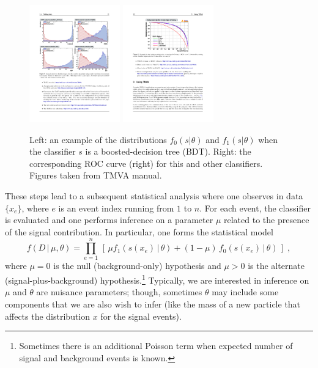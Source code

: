 \documentclass[11pt, oneside]{article}   	%
\begin{document}
\begin{figure}[htbp]
\begin{center}
 \includegraphics[height=2in]{example-TMVA-BDT.pdf}
 \includegraphics[height=2in]{example-TMVA-ROC.pdf}
\caption{Left: an example of the distributions $f_0(s|\theta)$ and $f_1(s|\theta)$ when the classifier $s$ is a boosted-decision tree (BDT). Right: the corresponding ROC curve (right) for this and other classifiers. Figures taken from TMVA manual.}
\label{fig:tmva}
\end{center}
\end{figure}

These steps lead to a subsequent statistical analysis where one observes in data $\{x_e\}$, where $e$ is an event index running from $1$ to $n$. For each event, the classifier is evaluated and one performs inference on a parameter $\mu$ related to the presence of the signal contribution. In particular, one forms the statistical model
\begin{equation}\label{eq:typicalML}
f( D \,|\, \mu, \theta) = \prod_{e=1}^n \, \left[\, \mu f_1( s(x_e) \, |\,  \theta)  + (1-\mu)\, f_0( s(x_e) \,|\, \theta) \,\right] \; ,
\end{equation}
where $\mu=0$ is the null (background-only) hypothesis and $\mu>0$ is the alternate (signal-plus-background) hypothesis.\footnote{Sometimes there is an additional Poisson term when expected number of signal and background events is known.} Typically, we are interested in inference on $\mu$ and $\theta$ are nuisance parameters; though, sometimes $\theta$ may include some components that we are also wish to infer (like the mass of a new particle that affects the distribution $x$ for the signal events).
\end{document}
